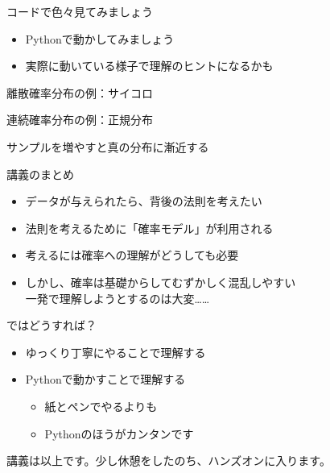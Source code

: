 \documentclass[dvipdfmx,cjk]{beamer}
\begin{document}
\begin{frame}{コードで色々見てみましょう} \pause

\begin{itemize}
    \item Pythonで動かしてみましょう
    \item 実際に動いている様子で理解のヒントになるかも
\end{itemize}

\end{frame}


\begin{frame}{離散確率分布の例：サイコロ}
\end{frame}


\begin{frame}{連続確率分布の例：正規分布}
\end{frame}


\begin{frame}{サンプルを増やすと真の分布に漸近する}
\end{frame}


\begin{frame}{講義のまとめ} \pause


\begin{itemize}
    \item データが与えられたら、背後の法則を考えたい \pause
    \item 法則を考えるために「確率モデル」が利用される \pause
    \item 考えるには確率への理解がどうしても必要 \pause
    \item しかし、確率は基礎からしてむずかしく混乱しやすい\\
          一発で理解しようとするのは大変…… \pause
\end{itemize}

\vskip 0.3cm
ではどうすれば？ \pause

\begin{itemize}
    \item ゆっくり丁寧にやることで理解する \pause
    \item Pythonで動かすことで理解する \pause
        \begin{itemize}
        \item 紙とペンでやるよりも
        \item Pythonのほうがカンタンです
        \end{itemize}
\end{itemize} \pause

\vskip 0.3cm
講義は以上です。少し休憩をしたのち、ハンズオンに入ります。

\end{frame}
\end{document}
